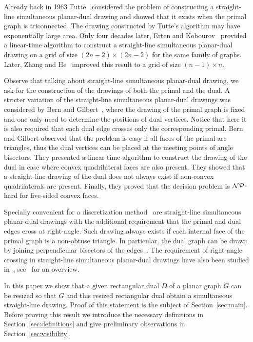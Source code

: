 \documentclass{llncs}
\begin{document}
Already back in 1963 Tutte~\cite{Tut63} considered the problem of constructing a straight-line simultaneous  planar-dual drawing and showed that it exists when the primal graph is triconnected. The drawing constructed by Tutte's algorithm may have exponentially large area. Only four decades later,  Erten and Kobourov~\cite{ErtenK05} provided a linear-time algorithm to construct a straight-line simultaneous planar-dual drawing on a grid of size $(2n-2) \times (2n-2)$ for the same family of graphs. Later, Zhang and He~\cite{ZH06} improved this result to a grid of size $(n-1) \times n$.

Observe that talking about straight-line simultaneous planar-dual drawing, we ask for the construction of the drawings of both the primal and the dual. A stricter variation of the straight-line simultaneous  planar-dual drawings was considered by Bern and Gilbert~\cite{BernG92}, where the drawing of the primal graph is fixed and one only need to determine the positions of dual vertices. Notice that here it is also required that each dual edge crosses only the corresponding primal. Bern and Gilbert observed that the problem is easy if all faces of the primal are triangles, thus the dual vertices can be placed at the meeting points of angle bisectors.
They presented a linear time algorithm to construct the drawing of the dual in case where convex quadrilateral faces are also present. They showed that a straight-line drawing of the dual does not always exist if non-convex quadrilaterals are present. Finally, they proved that the decision problem is $\cal NP$-hard for five-sided convex faces. 

Specially convenient for a discretization method~\cite{Baker88}  are straight-line simultaneous planar-dual drawings with the additional requirement that the primal and dual edges cross at right-angle.  Such drawing always exists if each internal face of the primal graph  is a non-obtuse triangle. In particular, the dual graph can be drawn by joining perpendicular bisectors of the edges~\cite{Bern92}. The requirement of right-angle crossing in  straight-line simultaneous planar-dual drawings have also been studied in~\cite{ArgyriouBKS13,Brightwell93,Mohar97}, see~\cite{gdhandbook13} for an overview.

In this paper we show that a given rectangular dual $D$ of a planar graph $G$ can be resized so that $G$ and this resized rectangular dual obtain a simultaneous straight-line drawing. Proof of this statement is the subject of Section~\ref{sec:main}. Before proving this result we introduce the necessary definitions in Section~\ref{sec:definitions} and give preliminary observations in Section~\ref{sec:visibility}.
\end{document}
